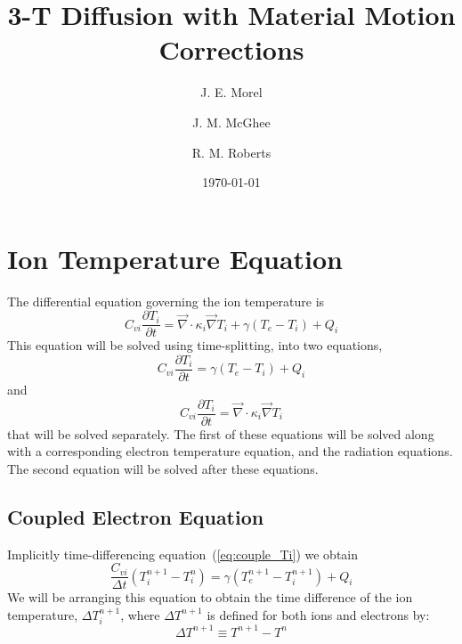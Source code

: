 \documentclass{article}
\newcommand{\partl}[2]{\ensuremath{\frac{\partial{#1}}{\partial{#2}}}}\newcommand{\del}{\ensuremath{\vec{\nabla}}}
\newcommand{\dt}{\ensuremath{\Delta t}}
\newcommand{\cviOdt}{\ensuremath{\frac{C_{vi}}{\dt}}}
\begin{document}
\title{3-T Diffusion with Material Motion Corrections}
\author{J. E. Morel \and J. M. McGhee \and R. M. Roberts}
\date{\today}

\maketitle

\newpage

\section{Ion Temperature Equation}

The differential equation governing the ion temperature is
\begin{equation}
        C_{vi} \partl{T_{i}}{t} = \del \cdot \kappa_{i} \del T_{i}
                                        + \gamma (T_{e}-T_{i}) + Q_{i}
\end{equation}
This equation will be solved using time-splitting, into two equations,
\begin{equation}
        C_{vi} \partl{T_{i}}{t} = \gamma (T_{e}-T_{i}) + Q_{i}
\label{eq:couple_Ti}
\end{equation}
and
\begin{equation}
        C_{vi} \partl{T_{i}}{t} = \del \cdot \kappa_{i} \del T_{i}
\label{eq:conduction_Ti}
\end{equation}
that will be solved separately.
The first of these equations will be solved along with a corresponding
electron temperature equation, and the radiation equations.
The second equation will be solved after these equations.

\subsection{Coupled Electron Equation}

Implicitly time-differencing equation~(\ref{eq:couple_Ti}) we obtain
\begin{equation}
        \cviOdt ( T_{i}^{n+1}-T_{i}^{n}) =
                 \gamma (T_{e}^{n+1}-T_{i}^{n+1}) + Q_{i}
\end{equation}
We will be arranging this equation to obtain the time difference of
the ion temperature, $\Delta T_{i}^{n+1}$,
where $\Delta T^{n+1}$ is defined for both ions and electrons by:
\begin{equation}
        \Delta T^{n+1} \equiv T^{n+1} - T^{n}
\end{equation}
\end{document}
